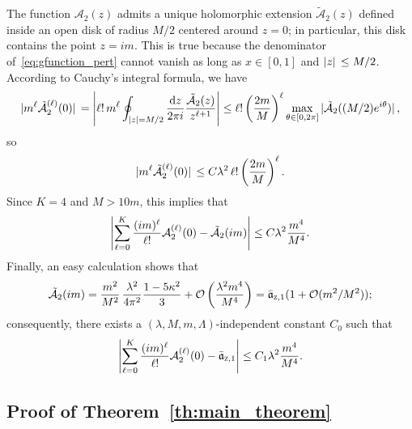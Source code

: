 \documentclass[a4paper, 11pt]{article}
\newcommand{\gyr}{\mathfrak{a}}								%
\newcommand{\BigO}{\mathcal{O}}								%
\newcommand{\cutoff}{\Lambda}								%
\theoremstyle{thm}
\begin{document}
The function $\mathcal{A}_2(z)$ admits a unique holomorphic extension $\tilde{\mathcal{A}}_2(z)$ defined inside an open disk of radius $M/2$ centered around $z = 0$; in particular, this disk contains the point $z = im$. This is true because the denominator of~\eqref{eq:gfunction_pert} cannot vanish as long as $x \in [0, 1]$ and $\abs*{z} \le M/2$. According to Cauchy's integral formula, we have
\begin{equation}
\label{eq:cauchy_estimates}
\abs*{m^\ell \tilde{\mathcal{A}}_2^{(\ell)}(0)} = \abs{\ell! \, m^\ell \oint_{\abs{z} = M/2} \frac{\dd{z}}{2\pi i} \frac{\tilde{\mathcal{A}}_2(z)}{z^{\ell + 1}}} \le \ell! \left( \frac{2m}{M} \right)^\ell \max_{\theta \in [0, 2\pi]} \abs*{\tilde{\mathcal{A}}_2((M/2)e^{i \theta})},
\end{equation}
so
\begin{equation}
\abs*{m^\ell \tilde{\mathcal{A}}_2^{(\ell)}(0)} \le C \lambda^2 \, \ell! \left( \frac{2m}{M} \right)^\ell.
\end{equation}
Since $K = 4$ and $M > 10m$, this implies that
\begin{equation}
\abs{\sum_{\ell = 0}^K \frac{(im)^\ell}{\ell!} \mathcal{A}^{(\ell)}_2(0) - \tilde{\mathcal{A}}_2(im)} \le C \lambda^2 \frac{m^4}{M^4}.
\end{equation}
Finally, an easy calculation shows that
\begin{equation}
\label{eq:A_expansion}
\tilde{\mathcal{A}}_2(im) = \frac{m^2}{M^2} \, \frac{\lambda^2}{4\pi^2} \frac{1- 5 \kappa^2}{3} + \BigO \left( \frac{\lambda^2 m^4}{M^4} \right) = \bar{\gyr}_{\textsc{z}, 1}(1 + \BigO(m^2/M^2));
\end{equation} 
consequently, there exists a $(\lambda, M, m, \cutoff)$-independent constant $C_0$ such that
\begin{equation}
\abs{\sum_{\ell = 0}^K \frac{(im)^\ell}{\ell!} \mathcal{A}^{(\ell)}_2(0) - \bar{\gyr}_{\textsc{z}, 1}} \le C_1 \lambda^2 \frac{m^4}{M^4}.
\end{equation}

\subsection{Proof of Theorem~\ref{th:main_theorem}}
\label{subsec:main_theorem_proof}
\end{document}
